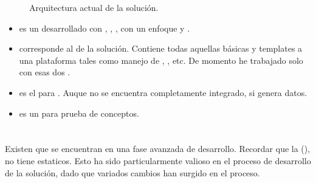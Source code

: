 \begin{figure}[H]
	\centering
	
	
	\caption{Arquitectura actual de la solución.}
	\label{cap:avances:current_architecture}
\end{figure}
	\begin{itemize}
		\item
			\textbf{\rtcom} es un \frameworkPC \ecommerce desarrollado con \meteorNAME, \nodejsNAME, \mongodbNAME, \coffeescript con un enfoque \reactive y \realTimeINT.
		\item
			\textbf{\rtcomCorePCKG} corresponde al \coreAS de la solución. Contiene todas aquellas \featuresCPT básicas y templates a una plataforma \ecommerce tales como manejo de \itemsCOM, \sessionsINT, etc. De momento he trabajado solo con esas dos \featuresCPT.
		\item
			\textbf{\rtcomGoogleanalPCKG} es el \moduleAS para \googleanalytics. Auque no se encuentra completamente integrado, si genera datos.
		\item
			\textbf{\helloworldPCKG} es un \moduleAS para prueba de conceptos.
	\end{itemize}

\section{\dataModelAS}

Existen \dataModelsAS que se encuentran en una fase avanzada de desarrollo. Recordar que la \dataBaseDB (\mongodbNAME), no tiene \schemasDB estaticos. Esto ha sido particularmente valioso en el proceso de desarrollo de la solución, dado que variados cambios han surgido en el proceso.

